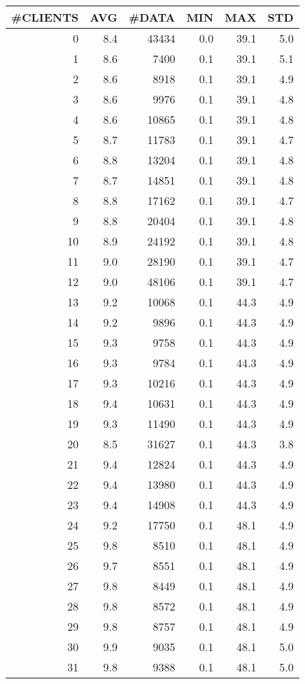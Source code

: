 \begin{tabular}{|r|r|r|r|r|r|}
\hline
 \#CLIENTS & AVG & \#DATA & MIN & MAX & STD\\
\hline
0 &  8.4 & 43434 & 0.0 & 39.1 & 5.0\\
1 &  8.6 & 7400 & 0.1 & 39.1 & 5.1\\
2 &  8.6 & 8918 & 0.1 & 39.1 & 4.9\\
3 &  8.6 & 9976 & 0.1 & 39.1 & 4.8\\
4 &  8.6 & 10865 & 0.1 & 39.1 & 4.8\\
5 &  8.7 & 11783 & 0.1 & 39.1 & 4.7\\
6 &  8.8 & 13204 & 0.1 & 39.1 & 4.8\\
7 &  8.7 & 14851 & 0.1 & 39.1 & 4.8\\
8 &  8.8 & 17162 & 0.1 & 39.1 & 4.7\\
9 &  8.8 & 20404 & 0.1 & 39.1 & 4.8\\
10 &  8.9 & 24192 & 0.1 & 39.1 & 4.8\\
11 &  9.0 & 28190 & 0.1 & 39.1 & 4.7\\
12 &  9.0 & 48106 & 0.1 & 39.1 & 4.7\\
13 &  9.2 & 10068 & 0.1 & 44.3 & 4.9\\
14 &  9.2 & 9896 & 0.1 & 44.3 & 4.9\\
15 &  9.3 & 9758 & 0.1 & 44.3 & 4.9\\
16 &  9.3 & 9784 & 0.1 & 44.3 & 4.9\\
17 &  9.3 & 10216 & 0.1 & 44.3 & 4.9\\
18 &  9.4 & 10631 & 0.1 & 44.3 & 4.9\\
19 &  9.3 & 11490 & 0.1 & 44.3 & 4.9\\
20 &  8.5 & 31627 & 0.1 & 44.3 & 3.8\\
21 &  9.4 & 12824 & 0.1 & 44.3 & 4.9\\
22 &  9.4 & 13980 & 0.1 & 44.3 & 4.9\\
23 &  9.4 & 14908 & 0.1 & 44.3 & 4.9\\
24 &  9.2 & 17750 & 0.1 & 48.1 & 4.9\\
25 &  9.8 & 8510 & 0.1 & 48.1 & 4.9\\
26 &  9.7 & 8551 & 0.1 & 48.1 & 4.9\\
27 &  9.8 & 8449 & 0.1 & 48.1 & 4.9\\
28 &  9.8 & 8572 & 0.1 & 48.1 & 4.9\\
29 &  9.8 & 8757 & 0.1 & 48.1 & 4.9\\
30 &  9.9 & 9035 & 0.1 & 48.1 & 5.0\\
31 &  9.8 & 9388 & 0.1 & 48.1 & 5.0\\

\end{tabular}
